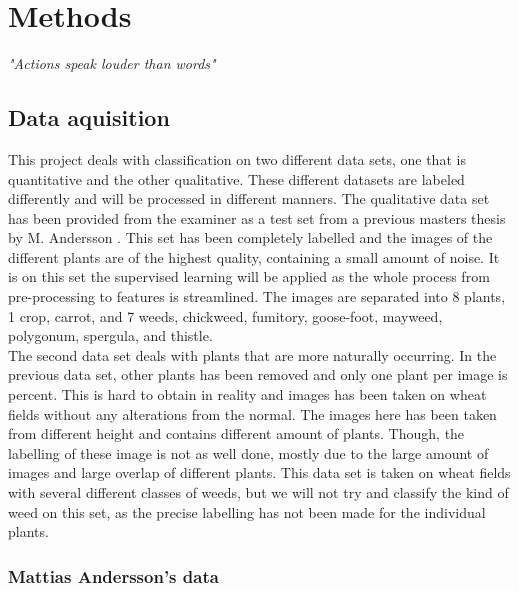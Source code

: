 \chapter{Methods}
\begin{center}
\vspace{-6ex}
\textit{"Actions speak louder than words"}
\vspace{6ex}
\end{center}
\label{cha:method}

\section{Data aquisition}

This project deals with classification on two different data sets, one that is quantitative and the other qualitative. These different datasets are labeled differently and will be processed in different manners. The qualitative data set has been provided from the examiner as a test set from a previous masters thesis by M. Andersson \cite{WeedClassification}. This set has been completely labelled and the images of the different plants are of the highest quality, containing a small amount of noise. It is on this set the supervised learning will be applied as the whole process from pre-processing to features is streamlined. The images are separated into 8 plants, 1 crop, carrot, and 7 weeds, chickweed, fumitory, goose-foot, mayweed, polygonum, spergula, and thistle.\\

The second data set deals with plants that are more naturally occurring. In the previous data set, other plants has been removed and only one plant per image is percent. This is hard to obtain in reality and images has been taken on  wheat fields without any alterations from the normal. The images here has been taken from different height and contains different amount of plants. Though, the labelling of these image is not as well done, mostly due to the large amount of images and large overlap of different plants. This data set is taken on wheat fields with several different classes of weeds, but we will not try and classify the kind of weed on this set, as the precise labelling has not been made for the individual plants.

\subsection{Mattias Andersson's data}

